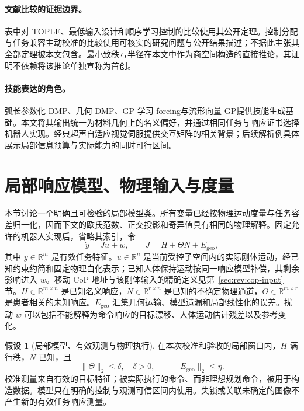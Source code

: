 \documentclass[11pt,a4paper]{article}
\numberwithin{equation}{section}
\theoremstyle{definition}
\newtheorem{assumption}[theorem]{假设}
\begin{document}
\paragraph{文献比较的证据边界。}
表中对 TOPLE、最低输入设计和顺序学习控制的比较使用其公开定理。控制分配与任务兼容主动校准的比较使用可核实的研究问题与公开结果描述；不据此主张其全部定理被本文包含。最小致秩亏半径在本文中作为商空间构造的直接推论，其证明不依赖将该推论单独宣称为首创。

\paragraph{技能表达的角色。}
弧长参数化 DMP\cite{aldmp2016}、几何 DMP\cite{gdmp2024}、GP 学习 forcing\cite{gpdmp2026}与流形向量 GP\cite{gpmanifold2021}提供技能生成基础。本文将其输出统一为材料几何上的名义偏好，并通过相同任务与响应证书选择机器人实现。经典超声自适应视觉伺服\cite{krupa2005}提供交互矩阵的相关背景；后续解析例具体展示局部信息预算与实际能力的同时可行区间。



\section{局部响应模型、物理输入与度量}
\label{sec:cal-local}

本节讨论一个明确且可检验的局部模型类。所有变量已经按物理运动度量与任务容差归一化，因而下文的欧氏范数、正交投影和奇异值具有相同的物理解释。固定允许的机器人实现后，省略其索引，令
\begin{equation}
  \dot y=Ju+w,\qquad
  J=H+\Theta N+E_{\mathrm{geo}},
  \label{eq:cal-model}
\end{equation}
其中 $y\in\mathbb R^m$ 是有效任务特征。$u\in\mathbb R^n$ 是当前受控子空间内的实际刚体运动，经已知约束约简和固定物理白化表示；已知人体保持运动按同一响应模型补偿，其剩余影响进入 $w$。移动 CoP 地址与该刚体输入的精确定义见第~\ref{sec:rev:cop-input}节。$H\in\mathbb R^{m\times n}$ 是已知名义响应，$N\in\mathbb R^{r\times n}$ 是已知的不确定物理通道，$\Theta\in\mathbb R^{m\times r}$ 是患者相关的未知响应。$E_{\mathrm{geo}}$ 汇集几何运输、模型遗漏和局部线性化的误差。扰动 $w$ 可以包括不能解释为命令响应的目标漂移、人体运动估计残差以及参考变化。

\begin{assumption}[局部模型、有效观测与物理执行]
\label{ass:cal-model}
在本次校准和验收的局部窗口内，$H$ 满行秩，$N$ 已知，且
\begin{equation}
  \|\Theta\|_2\le\delta,\quad\delta>0,\qquad
  \|E_{\mathrm{geo}}\|_2\le\eta .
\end{equation}
校准测量来自有效的目标特征；被实际执行的命令、而非理想规划命令，被用于构造数据。模型只在明确的控制与观测可信区间内使用。失锁或关联未确定的图像不产生新的有效任务响应测量。
\end{assumption}
\end{document}
